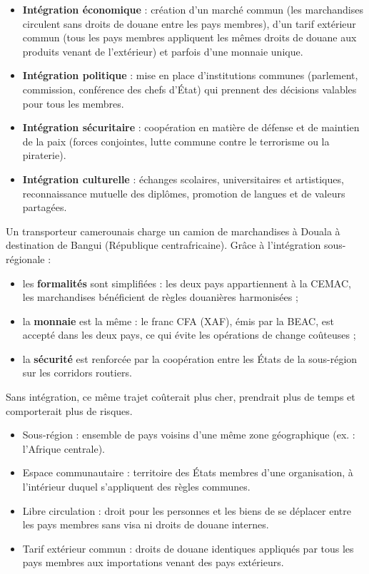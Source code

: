 \documentclass[11pt]{article}
\newcommand{\cle}[1]{{\popxbold\color{popdark}#1}}
\begin{document}
\begin{itemize}
\item \textbf{Intégration économique} : création d'un \cle{marché commun} (les marchandises circulent sans droits de douane entre les pays membres), d'un \cle{tarif extérieur commun} (tous les pays membres appliquent les mêmes droits de douane aux produits venant de l'extérieur) et parfois d'une \cle{monnaie unique}.
\item \textbf{Intégration politique} : mise en place d'\cle{institutions communes} (parlement, commission, conférence des chefs d'État) qui prennent des décisions valables pour tous les membres.
\item \textbf{Intégration sécuritaire} : coopération en matière de défense et de maintien de la paix (forces conjointes, lutte commune contre le terrorisme ou la piraterie).
\item \textbf{Intégration culturelle} : échanges scolaires, universitaires et artistiques, reconnaissance mutuelle des diplômes, promotion de langues et de valeurs partagées.
\end{itemize}

\begin{exemplebox}
Un transporteur camerounais charge un camion de marchandises à Douala à destination de Bangui (République centrafricaine). Grâce à l'intégration sous-régionale :
\begin{itemize}
\item les \textbf{formalités} sont simplifiées : les deux pays appartiennent à la CEMAC, les marchandises bénéficient de règles douanières harmonisées ;
\item la \textbf{monnaie} est la même : le franc CFA (XAF), émis par la BEAC, est accepté dans les deux pays, ce qui évite les opérations de change coûteuses ;
\item la \textbf{sécurité} est renforcée par la coopération entre les États de la sous-région sur les corridors routiers.
\end{itemize}
Sans intégration, ce même trajet coûterait plus cher, prendrait plus de temps et comporterait plus de risques.
\end{exemplebox}

\begin{aretenir}
\begin{itemize}
\item \cle{Sous-région} : ensemble de pays voisins d'une même zone géographique (ex. : l'Afrique centrale).
\item \cle{Espace communautaire} : territoire des États membres d'une organisation, à l'intérieur duquel s'appliquent des règles communes.
\item \cle{Libre circulation} : droit pour les personnes et les biens de se déplacer entre les pays membres sans visa ni droits de douane internes.
\item \cle{Tarif extérieur commun} : droits de douane identiques appliqués par tous les pays membres aux importations venant des pays extérieurs.
\end{itemize}
\end{aretenir}
\end{document}
